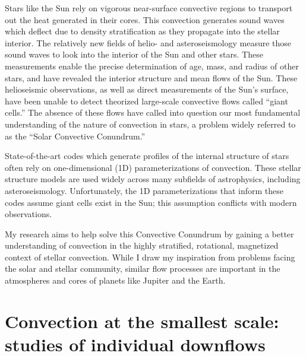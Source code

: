 \documentclass[11pt, preprint]{aastex}
\begin{document}
Stars like the Sun rely on vigorous near-surface convective regions to transport out the heat generated in their cores.
This convection generates sound waves which deflect due to density stratification as they propagate into the stellar interior.
The relatively new fields of helio- and asteroseismology measure those sound waves to look into the interior of the Sun and other stars.
These measurements enable the precise determination of age, mass, and radius of other stars, and have revealed the interior structure and mean flows of the Sun.
These helioseismic observations, as well as direct measurements of the Sun's surface, have been unable to detect theorized large-scale convective flows called ``giant cells.''
The absence of these flows have called into question our most fundamental understanding of the nature of convection in stars, a problem widely referred to as the ``Solar Convective Conundrum.''

State-of-the-art codes which generate profiles of the internal structure of stars often rely on one-dimensional (1D) parameterizations of convection.
These stellar structure models are used widely across many subfields of astrophysics, including asteroseismology.
Unfortunately, the 1D parameterizations that inform these codes assume giant cells exist in the Sun; this assumption conflicts with modern observations.

My research aims to  help solve this Convective Conundrum by gaining a better understanding of convection in the highly stratified, rotational, magnetized context of stellar convection.
While I draw my inspiration from problems facing the solar and stellar community, similar flow processes are important in the atmospheres and cores of planets like Jupiter and the Earth. 

\vspace{-14pt}
\section{Convection at the smallest scale: studies of individual downflows}
\vspace{-6pt}
\end{document}
